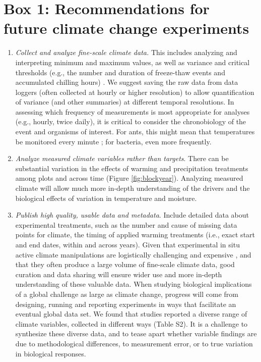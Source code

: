 \documentclass{article}
\begin{document}
\section* {Box 1: Recommendations for future climate change experiments} 
\begin{enumerate}
\item\textit{Collect and analyze fine-scale climate data.} This includes analyzing and interpreting minimum and maximum values, as well as variance and critical thresholds (e.g., the number and duration of freeze-thaw events and accumulated chilling hours) \citep{mcdaniel2014,vasseur2014}. We suggest saving the raw data from data loggers (often collected at hourly or higher resolution) to allow quantification of variance (and other summaries) at different temporal resolutions. In assessing which frequency of measurements is most appropriate for analyses (e.g., hourly, twice daily), it is critical to consider the chronobiology of the event and organisms of interest. For ants, this might mean that temperatures be monitored every minute \citep{shavit2017}; for bacteria, even more frequently. 
\item\textit{Analyze measured climate variables rather than targets}. There can be substantial variation in the effects of warming and precipitation treatments among plots and across time (Figure \ref{fig:blockyear}). Analyzing measured climate will allow much more in-depth understanding of the drivers and the biological effects of variation in temperature and moisture. %
\item\textit{Publish high quality, usable data and metadata}. Include detailed data about experimental treatments, such as the number and cause of missing data points for climate, the timing of applied warming treatments (i.e., exact start and end dates, within and across years). Given that experimental in situ active climate manipulations are logistically challenging and expensive \citep{aronson2009}, and that they often produce a large volume of fine-scale climate data, good curation and data sharing will ensure wider use and more in-depth understanding of these valuable data. When studying biological implications of a global challenge as large as climate change, progress will come from designing, running and reporting experiments in ways that facilitate an eventual global data set. We found that studies reported a diverse range of climate variables, collected in different ways (Table S2). It is a challenge to synthesize these diverse data, and to tease apart whether variable findings are due to methodological differences, to measurement error, or to true variation in biological responses. %

\end{enumerate}
\end{document}
